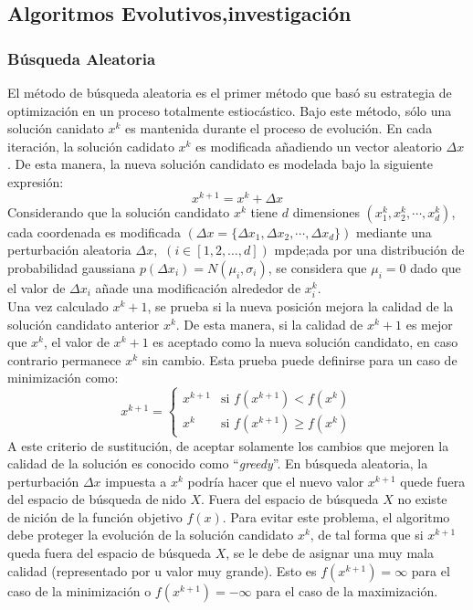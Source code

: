 \documentclass{article}
\begin{document}
\subsection{Algoritmos Evolutivos,investigación}
\subsubsection{B\'usqueda Aleatoria}
El m\'etodo de b\'usqueda aleatoria  es el primer m\'etodo que bas\'o su estrategia de optimizaci\'on en un proceso totalmente estioc\'astico. Bajo este m\'etodo, s\'olo una soluci\'on canidato $x^k$ es mantenida durante el proceso de evoluci\'on. En cada iteraci\'on, la soluci\'on cadidato $x^k$ es modificada a\~nadiendo un vector aleatorio $\Delta x$. De esta manera, la nueva soluci\'on candidato es modelada bajo la siguiente expresi\'on:
\begin{equation*}
    x^{k+1} = x^{k} + \Delta x
\end{equation*}
Considerando que la soluci\'on candidato $x^k$ tiene $d$ dimensiones $\left( x_1^k,x_2^k, \cdots, x_d^k\right)$, cada coordenada es modificada $\left( \Delta x = \{ \Delta x_1, \Delta x_2, \cdots, \Delta x_d\} \right)$ mediante una perturbaci\'on aleatoria $\Delta x,$ $\left( i \in [1,2, \dots, d]\right)$ mpde;ada por una distribuci\'on de probabilidad gaussiana $p(\Delta x_i) = N(\mu_i, \sigma_i)$, se considera que $\mu_i = 0$ dado que el valor de $\Delta x_i$ a\~nade una modificaci\'on alrededor de $x_i^k$.\\Una vez calculado $x^k+1$, se prueba si la nueva posición mejora la calidad de la solución candidato anterior $x^k$. De esta manera, si la calidad de $x^k+1$ es mejor que $x^k$, el valor de $x^k+1$ es aceptado como la nueva solución candidato, en caso contrario permanece $x^k$ sin cambio.  Esta prueba puede definirse para un caso de minimización como:
\begin{equation*}
     x^{k+1} = \left \{ \begin{matrix} x^{k+1} & \mbox{si }f(x^{k+1}) < f(x^k)
\\ x^k & \mbox{si }f(x^{k+1}) \geq f(x^k)\end{matrix}\right. 
\end{equation*}
A este criterio de sustitución, de aceptar solamente los cambios que mejoren la calidad de la solución es conocido como “\textit{greedy}”. En búsqueda aleatoria, la perturbación $\Delta x$ impuesta a $x^k$ podría hacer que el nuevo valor $x^{k+1}$ quede fuera del espacio de búsqueda denido $X$. Fuera del espacio de búsqueda $X$ no existe denición de la función objetivo  $f(x)$. Para evitar este problema, el algoritmo debe proteger la evolución de la solución candidato $x^k$, de tal forma que si $x^{k+1}$ queda fuera del espacio de búsqueda $X$, se le debe de asignar una muy mala calidad (representado por u valor muy grande). Esto es $f(x^{k+1}) = \infty$ para el caso de la minimizaci\'on o $f(x^{k+1}) = - \infty$ para el caso de la maximizaci\'on.
\end{document}
